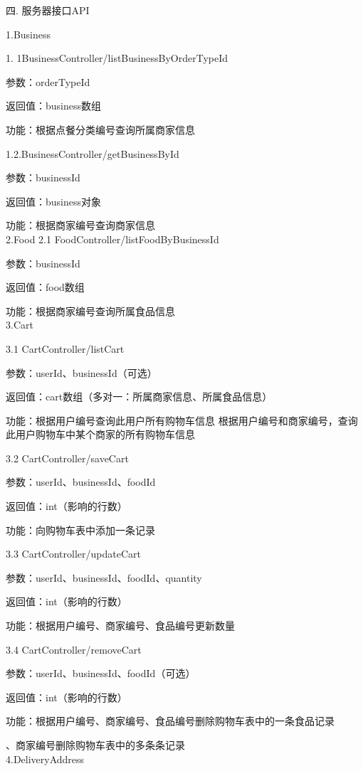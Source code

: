 \noindent
四. 服务器接口API

1.Business 

1. 1BusinessController/listBusinessByOrderTypeId 

参数：orderTypeId 

返回值：business数组 

功能：根据点餐分类编号查询所属商家信息 

1.2.BusinessController/getBusinessById 

参数：businessId 

返回值：business对象 

功能：根据商家编号查询商家信息 ~\\

2.Food 
2.1 FoodController/listFoodByBusinessId 

参数：businessId 

返回值：food数组 

功能：根据商家编号查询所属食品信息 ~\\

3.Cart 

3.1 CartController/listCart 

参数：userId、businessId（可选） 

返回值：cart数组（多对一：所属商家信息、所属食品信息） 

功能：根据用户编号查询此用户所有购物车信息 
根据用户编号和商家编号，查询此用户购物车中某个商家的所有购物车信息 

3.2 CartController/saveCart 

参数：userId、businessId、foodId 

返回值：int（影响的行数） 

功能：向购物车表中添加一条记录 

3.3 CartController/updateCart 

参数：userId、businessId、foodId、quantity 

返回值：int（影响的行数） 

功能：根据用户编号、商家编号、食品编号更新数量 

3.4 CartController/removeCart 

参数：userId、businessId、foodId（可选） 

返回值：int（影响的行数） 

功能：根据用户编号、商家编号、食品编号删除购物车表中的一条食品记录 

\qquad{}、商家编号删除购物车表中的多条条记录~\\

4.DeliveryAddress 

